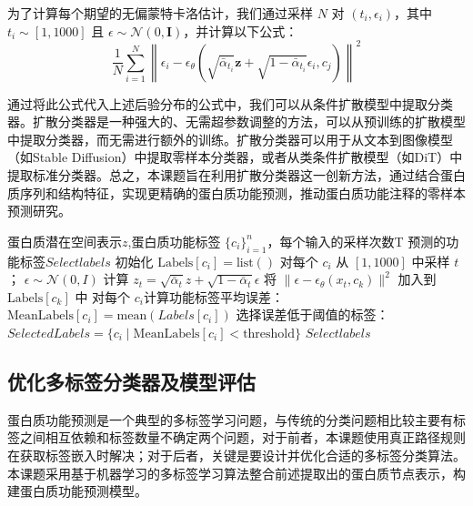 为了计算每个期望的无偏蒙特卡洛估计\cite{doucet2015efficient}，我们通过采样 \(N\) 对 \((t_i, \epsilon_i)\)，其中 \(t_i \sim [1, 1000]\) 且 \(\epsilon \sim \mathcal{N}(0, \mathbf{I})\)，并计算以下公式：
\begin{equation}
    \frac{1}{N} \sum_{i=1}^N \left\|\epsilon_i - \epsilon_\theta\left(\sqrt{\bar{\alpha}_{t_i}} \mathbf{z} + \sqrt{1 - \bar{\alpha}_{t_i}} \epsilon_i, c_j\right)\right\|^2
\end{equation}

通过将此公式代入上述后验分布的公式中，我们可以从条件扩散模型中提取分类器。扩散分类器是一种强大的、无需超参数调整的方法，可以从预训练的扩散模型中提取分类器，而无需进行额外的训练。扩散分类器可以用于从文本到图像模型（如Stable Diffusion\cite{rombach2022high}）中提取零样本分类器，或者从类条件扩散模型（如DiT\cite{peebles2023scalable}）中提取标准分类器。总之，本课题旨在利用扩散分类器这一创新方法，通过结合蛋白质序列和结构特征，实现更精确的蛋白质功能预测，推动蛋白质功能注释的零样本预测研究。
\renewcommand{\algorithmicrequire}{\textbf{输入:}}  
\renewcommand{\algorithmicensure}{\textbf{输出:}} 
\begin{algorithm}
\caption{基于扩散模型的蛋白质功能分类器}
\begin{algorithmic}[1]
\REQUIRE  蛋白质潜在空间表示$z$,蛋白质功能标签 $\{c_i\}_{i=1}^n$，每个输入的采样次数T
\ENSURE  预测的功能标签$Selectlabels$
\STATE 初始化 $\text{Labels}[c_i] = \text{list}()$ 对每个 $c_i$
    \STATE 从 $[1, 1000]$ 中采样 $t$； $\epsilon \sim \mathcal{N}(0, I)$
    \STATE 计算 $z_t = \sqrt{\bar{\alpha}_t}z + \sqrt{1 - \bar{\alpha}_t}\epsilon$
        \STATE 将 $\|\epsilon - \epsilon_\theta(x_t, c_k)\|^2$ 加入到 $\text{Labels}[c_k]$ 中
    \ENDFOR
\ENDFOR
\STATE 对每个 $c_i$计算功能标签平均误差：$\text{MeanLabels}[c_i] = \text{mean}(Labels[c_i])$ 
\STATE 选择误差低于阈值的标签：$SelectedLabels = \{c_i \mid \text{MeanLabels}[c_i] < \text{threshold}\}$
\RETURN $Selectlabels$
\end{algorithmic}
\end{algorithm}
\subsection{优化多标签分类器及模型评估}
蛋白质功能预测是一个典型的多标签学习问题，与传统的分类问题相比较主要有标签之间相互依赖和标签数量不确定两个问题，对于前者，本课题使用真正路径规则在获取标签嵌入时解决；对于后者，关键是要设计并优化合适的多标签分类算法。本课题采用基于机器学习的多标签学习算法整合前述提取出的蛋白质节点表示，构建蛋白质功能预测模型。

